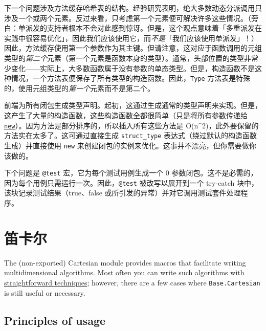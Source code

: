 下一个问题涉及方法缓存哈希表的结构。经验研究表明，绝大多数动态分派调用只涉及一个或两个元素。反过来看，只考虑第一个元素便可解决许多这些情况。（旁白：单派发的支持者根本不会对此感到惊讶。但是，这个观点意味着「多重派发在实践中很容易优化」，因此我们应该使用它，而\emph{不是}「我们应该使用单派发」！）因此，方法缓存使用第一个参数作为其主键。但请注意，这对应于函数调用的元组类型的\emph{第二个}元素（第一个元素是函数本身的类型）。通常，头部位置的类型非常少变化——实际上，大多数函数属于没有参数的单态类型。但是，构造函数不是这种情况，一个方法表便保存了所有类型的构造函数。因此，\texttt{Type} 方法表是特殊的，使用元组类型的\emph{第一个}元素而不是第二个。



前端为所有闭包生成类型声明。起初，这通过生成通常的类型声明来实现。但是，这产生了大量的构造函数，这些构造函数全都很简单（只是将所有参数传递给 \hyperlink{13888762393600028594}{\texttt{new}}）。因为方法是部分排序的，所以插入所有这些方法是 O(n{\textasciicircum}2)，此外要保留的方法实在太多了。这可通过直接生成 \texttt{struct\_type} 表达式（绕过默认的构造函数生成）并直接使用 \texttt{new} 来创建闭包的实例来优化。这事并不漂亮，但你需要做你该做的。



下个问题是 \texttt{@test} 宏，它为每个测试用例生成一个 0 参数闭包。这不是必需的，因为每个用例只需运行一次。因此，\texttt{@test} 被改写以展开到一个 try-catch 块中，该块记录测试结果（true、false 或所引发的异常）并对它调用测试套件处理程序。



\hypertarget{3626588894035984514}{}


\section{笛卡尔}



The (non-exported) Cartesian module provides macros that facilitate writing multidimensional algorithms. Most often you can write such algorithms with \href{https://julialang.org/blog/2016/02/iteration}{straightforward techniques}; however, there are a few cases where \texttt{Base.Cartesian} is still useful or necessary.



\hypertarget{10560451956896766301}{}


\subsection{Principles of usage}



